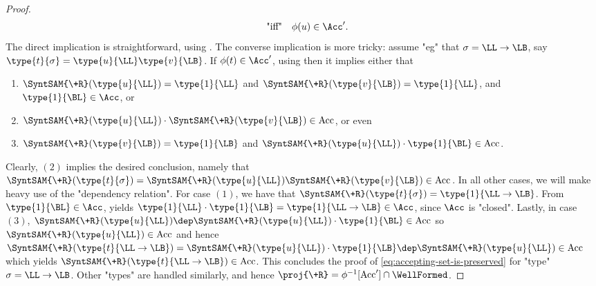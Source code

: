 \begin{proof}
\begin{equation}
		\quad\text{"iff"}\quad
		\phi(u) \in \Acc'.
		\label{eq:accepting-set-is-preserved}
	\end{equation}
	The direct implication is straightforward, using
	.
	The converse implication is more tricky: assume "eg" that $\sigma = \LL\to\LB$,
	say $\type{t}{\sigma} = \type{u}{\LL}\type{v}{\LB}$.
	If $\phi(t) \in \Acc'$, using  then it implies either that
	\begin{enumerate}
		\item $\SyntSAM{\+R}(\type{u}{\LL}) = \type{1}{\LL}$ and $\SyntSAM{\+R}(\type{v}{\LB}) = \type{1}{\LL}$, and $\type{1}{\BL} \in \Acc$, or
		\item $\SyntSAM{\+R}(\type{u}{\LL})\cdot \SyntSAM{\+R}(\type{v}{\LB}) \in \Acc$, or even
		\item $\SyntSAM{\+R}(\type{v}{\LB}) = \type{1}{\LB}$ and
			$\SyntSAM{\+R}(\type{u}{\LL})\cdot \type{1}{\BL} \in \Acc$.
	\end{enumerate}
	Clearly, $(2)$ implies the desired conclusion, namely that $\SyntSAM{\+R}(\type{t}{\sigma}) = \SyntSAM{\+R}(\type{u}{\LL})\SyntSAM{\+R}(\type{v}{\LB}) \in \Acc$.
	In all other cases, we will make heavy use of the "dependency relation".
	For case $(1)$, we have that $\SyntSAM{\+R}(\type{t}{\sigma}) = \type{1}{\LL\to\LB}$.
	From $\type{1}{\BL} \in \Acc$,  yields $\type{1}{\LL} \cdot \type{1}{\LB} = \type{1}{\LL\to\LB} \in \Acc$, since $\Acc$ is "closed".
	Lastly, in case $(3)$, $\SyntSAM{\+R}(\type{u}{\LL}) \dep
	\SyntSAM{\+R}(\type{u}{\LL})\cdot \type{1}{\BL} \in \Acc$ so
	$\SyntSAM{\+R}(\type{u}{\LL}) \in \Acc$ and hence
	$\SyntSAM{\+R}(\type{t}{\LL\to\LB}) = \SyntSAM{\+R}(\type{u}{\LL}) \cdot \type{1}{\LB}
	\dep \SyntSAM{\+R}(\type{u}{\LL}) \in \Acc$ which yields
	$\SyntSAM{\+R}(\type{t}{\LL\to\LB}) \in \Acc$. This concludes the proof
	of \eqref{eq:accepting-set-is-preserved} for "type" $\sigma = \LL\to\LB$.
	Other "types" are handled similarly, and hence
	$\proj{\+R} = \phi^{-1}[\Acc']\cap\WellFormed$.
\end{proof}

